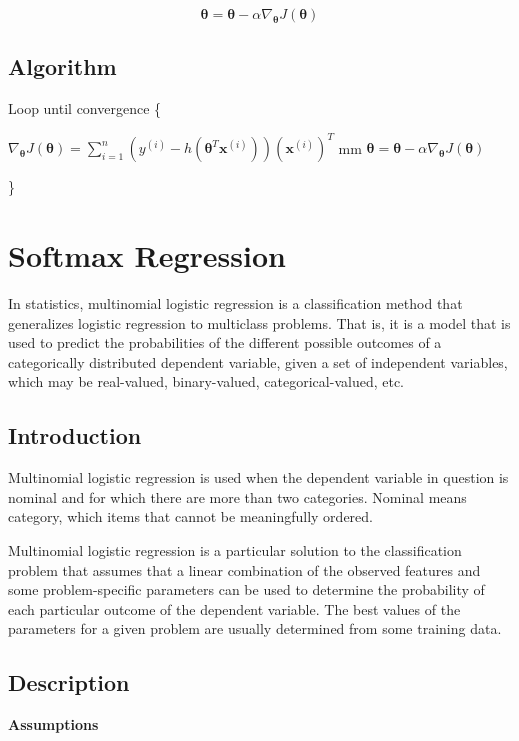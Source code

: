 \[	
	\boldsymbol\theta = \boldsymbol\theta - \alpha \nabla _{\boldsymbol\theta} J(\boldsymbol\theta)
\]





\subsection{Algorithm}
Loop until convergence \{

	\qquad $\nabla _{\boldsymbol\theta} J(\boldsymbol\theta) = \sum_{i=1}^n (y^{(i)}-h(\boldsymbol \theta^T\boldsymbol x^{(i)})) (\boldsymbol x^{(i)})^T$
	 mm
	\qquad $\boldsymbol\theta = \boldsymbol\theta - \alpha \nabla _{\boldsymbol\theta} J(\boldsymbol\theta)$

\}










\newpage 
\section{Softmax Regression}
In statistics, multinomial logistic regression is a classification method that generalizes logistic regression to multiclass problems. That is, it is a model that is used to predict the probabilities of the different possible outcomes of a categorically distributed dependent variable, given a set of independent variables, which may be real-valued, binary-valued, categorical-valued, etc.


\subsection{Introduction}
Multinomial logistic regression is used when the dependent variable in question is nominal and for which there are more than two categories. Nominal means category, which items that cannot be meaningfully ordered.

Multinomial logistic regression is a particular solution to the classification problem that assumes that a linear combination of the observed features and some problem-specific parameters can be used to determine the probability of each particular outcome of the dependent variable. The best values of the parameters for a given problem are usually determined from some training data.

\subsection{Description}

\textbf{Assumptions}

